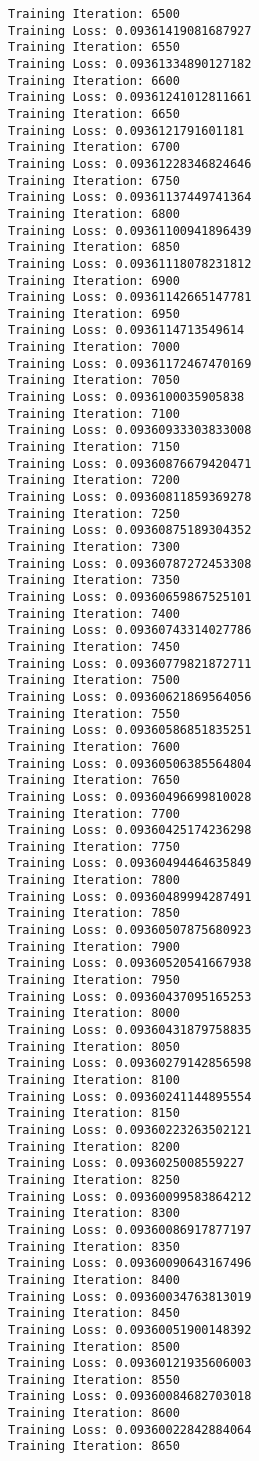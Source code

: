 \documentclass[11pt]{article}
\begin{document}
\begin{Verbatim}[commandchars=\\\{\}]
Training Iteration: 6500
Training Loss: 0.09361419081687927
Training Iteration: 6550
Training Loss: 0.09361334890127182
Training Iteration: 6600
Training Loss: 0.09361241012811661
Training Iteration: 6650
Training Loss: 0.0936121791601181
Training Iteration: 6700
Training Loss: 0.09361228346824646
Training Iteration: 6750
Training Loss: 0.09361137449741364
Training Iteration: 6800
Training Loss: 0.09361100941896439
Training Iteration: 6850
Training Loss: 0.09361118078231812
Training Iteration: 6900
Training Loss: 0.09361142665147781
Training Iteration: 6950
Training Loss: 0.0936114713549614
Training Iteration: 7000
Training Loss: 0.09361172467470169
Training Iteration: 7050
Training Loss: 0.0936100035905838
Training Iteration: 7100
Training Loss: 0.09360933303833008
Training Iteration: 7150
Training Loss: 0.09360876679420471
Training Iteration: 7200
Training Loss: 0.09360811859369278
Training Iteration: 7250
Training Loss: 0.09360875189304352
Training Iteration: 7300
Training Loss: 0.09360787272453308
Training Iteration: 7350
Training Loss: 0.09360659867525101
Training Iteration: 7400
Training Loss: 0.09360743314027786
Training Iteration: 7450
Training Loss: 0.09360779821872711
Training Iteration: 7500
Training Loss: 0.09360621869564056
Training Iteration: 7550
Training Loss: 0.09360586851835251
Training Iteration: 7600
Training Loss: 0.09360506385564804
Training Iteration: 7650
Training Loss: 0.09360496699810028
Training Iteration: 7700
Training Loss: 0.09360425174236298
Training Iteration: 7750
Training Loss: 0.09360494464635849
Training Iteration: 7800
Training Loss: 0.09360489994287491
Training Iteration: 7850
Training Loss: 0.09360507875680923
Training Iteration: 7900
Training Loss: 0.09360520541667938
Training Iteration: 7950
Training Loss: 0.09360437095165253
Training Iteration: 8000
Training Loss: 0.09360431879758835
Training Iteration: 8050
Training Loss: 0.09360279142856598
Training Iteration: 8100
Training Loss: 0.09360241144895554
Training Iteration: 8150
Training Loss: 0.09360223263502121
Training Iteration: 8200
Training Loss: 0.0936025008559227
Training Iteration: 8250
Training Loss: 0.09360099583864212
Training Iteration: 8300
Training Loss: 0.09360086917877197
Training Iteration: 8350
Training Loss: 0.09360090643167496
Training Iteration: 8400
Training Loss: 0.09360034763813019
Training Iteration: 8450
Training Loss: 0.09360051900148392
Training Iteration: 8500
Training Loss: 0.09360121935606003
Training Iteration: 8550
Training Loss: 0.09360084682703018
Training Iteration: 8600
Training Loss: 0.09360022842884064
Training Iteration: 8650

\end{Verbatim}
\end{document}
